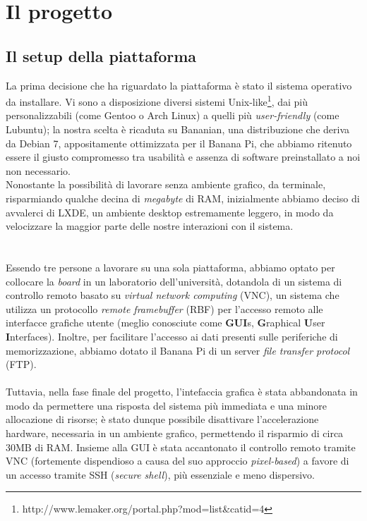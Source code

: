 
\chapter{Il progetto} %

\label{Chapter6} %



\section{Il setup della piattaforma}
La prima decisione che ha riguardato la piattaforma è stato il sistema 
operativo da installare. Vi sono a disposizione diversi sistemi 
Unix-like\footnote{http://www.lemaker.org/portal.php?mod=list\&catid=4}, 
dai più personalizzabili (come Gentoo o Arch Linux) a quelli più
 \emph{user-friendly} (come Lubuntu); la nostra scelta è ricaduta su Bananian, 
una distribuzione che deriva da Debian 7, appositamente ottimizzata per il 
Banana Pi, che abbiamo ritenuto essere il giusto compromesso tra usabilità
e assenza di software preinstallato a noi non necessario. \\
Nonostante la possibilità di lavorare senza ambiente grafico, da terminale, 
risparmiando qualche decina di \emph{megabyte} di RAM, inizialmente abbiamo 
deciso di avvalerci di LXDE, un ambiente desktop estremamente leggero, in modo da 
velocizzare la maggior parte delle nostre interazioni con il sistema. \\
\\ \\
Essendo tre persone a lavorare su una sola piattaforma, abbiamo optato 
per collocare la \emph{board} in un laboratorio dell'università, dotandola
di un sistema di controllo remoto basato su \emph{virtual network computing} 
(VNC), un sistema che utilizza un protocollo \emph{remote framebuffer} (RBF) 
per l'accesso remoto alle interfacce grafiche utente (meglio conosciute come 
\textbf{GUI}s, \textbf{G}raphical \textbf{U}ser \textbf{I}nterfaces). Inoltre, 
per facilitare l'accesso ai dati presenti sulle periferiche di memorizzazione, 
abbiamo dotato il Banana Pi di un server \emph{file transfer protocol} (FTP).
\\ \\ 
Tuttavia, nella fase finale del progetto, l'intefaccia grafica è stata 
abbandonata in modo da permettere una risposta del sistema più immediata e una 
minore allocazione di risorse; è stato dunque possibile disattivare 
l'accelerazione hardware, necessaria in un ambiente grafico, permettendo il 
risparmio di circa 30MB di RAM. Insieme alla GUI è stata accantonato il 
controllo remoto tramite VNC (fortemente dispendioso a causa del suo approccio 
\emph{pixel-based}) a favore di un accesso tramite SSH (\emph{secure shell}), 
più essenziale e meno dispersivo.

